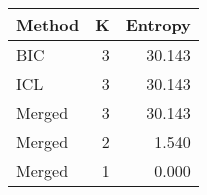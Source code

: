 \begin{center} 
\begin{tabular}{lrr}
 Method & K & Entropy \\ 
  \hline
\hline
BIC &    3 & 30.143 \\ 
  ICL &    3 & 30.143 \\ 
  Merged &    3 & 30.143 \\ 
  Merged &    2 & 1.540 \\ 
  Merged &    1 & 0.000 \\ 
  \end{tabular}
\end{center} 
